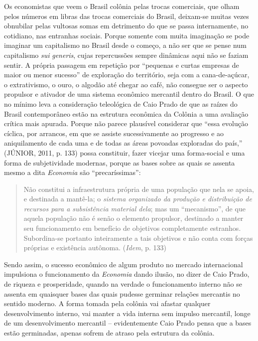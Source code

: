 Os economistas que veem o Brasil colônia pelas trocas comerciais, que
olham pelos números em libras das trocas comerciais do Brasil, deixam-se
muitas vezes obnubilar pelas vultosas somas em detrimento do que se
passa internamente, no cotidiano, nas entranhas sociais. Porque somente
com muita imaginação se pode imaginar um capitalismo no Brasil desde o
começo, a não ser que se pense num capitalismo \emph{sui}
\emph{generis}, cujas repercussões sempre dinâmicas aqui não se faziam
sentir. A própria passagem em repetição por ``pequenas e curtas empresas
de maior ou menor sucesso'' de exploração do território, seja com a
cana-de-açúcar, o extrativismo, o ouro, o algodão até chegar ao café,
não consegue ser o aspecto propulsor e ativador de uma sistema econômico
mercantil dentro do Brasil. O que no mínimo leva a consideração
teleológica de Caio Prado de que as raízes do Brasil contemporâneo estão
na estrutura econômica da Colônia a uma avaliação crítica mais apurada.
Porque não parece plausível considerar que ``essa evolução cíclica, por
arrancos, em que se assiste sucessivamente ao progresso e ao
aniquilamento de cada uma e de todas as áreas povoadas exploradas do
país,'' (JÚNIOR, 2011, p. 133) possa constituir, fazer vicejar uma
forma-social e uma forma de subjetividade modernas, porque as bases
sobre as quais se assenta mesmo a dita \emph{Economia} são
``precaríssimas'':

\begin{quote}
Não constitui a infraestrutura própria de uma população que nela se
apoia, e destinada a mantê-la; o \emph{sistema organizado da produção e
distribuição de recursos para a subsistência material dela}; mas um
``mecanismo'', de que aquela população não é senão o elemento propulsor,
destinado a manter seu funcionamento em benefício de objetivos
completamente estranhos. Subordina-se portanto inteiramente a tais
objetivos e não conta com forças próprias e existência autônoma.
(\emph{Idem}, p. 133)
\end{quote}

Sendo assim, o sucesso econômico de algum produto no mercado
internacional impulsiona o funcionamento da \emph{Economia} dando
ilusão, no dizer de Caio Prado, de riqueza e prosperidade, quando na
verdade o funcionamento interno não se assenta em quaisquer bases das
quais pudesse germinar relações mercantis no sentido moderno. A forma
tomada pela colônia vai afastar qualquer desenvolvimento interno, vai
manter a vida interna sem impulso mercantil, longe de um desenvolvimento
mercantil -- evidentemente Caio Prado pensa que a bases estão
germinadas, apenas sofrem de atraso pela estrutura da colônia.

